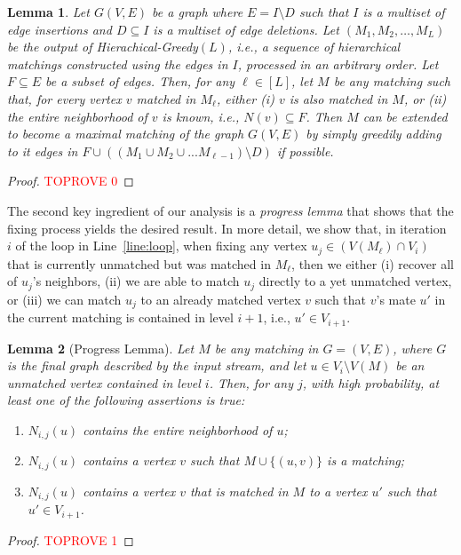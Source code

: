\documentclass[11pt,a4paper]{article}
\newtheorem{lemma}{Lemma}
\begin{document}
\begin{lemma}\label{lem:key-1}
Let $G(V,E)$ be a graph where $E = I \setminus D$ such that $I$ is a multiset of edge insertions and $D \subseteq I$ is a multiset of edge deletions. Let $(M_1, M_2, \dots, M_{L})$ be the output of \textsf{Hierachical-Greedy}$(L)$, i.e., a sequence of hierarchical matchings constructed using the edges in $I$, processed in an arbitrary order. Let $F \subseteq E$ be a subset of edges. Then, for any $\ell \in [L]$, let $M$ be any matching such that, for every vertex $v$ matched in $M_{\ell}$, either (i) $v$ is also matched in $M$, or (ii) the entire neighborhood of $v$ is known, i.e., $N(v) \subseteq F$. Then $M$ can be extended to become a maximal matching of the graph $G(V,E)$ by simply greedily adding to it edges in $F \cup \left( (M_1 \cup M_2 \cup ... M_{\ell-1}) \setminus D \right)$ if possible.
\end{lemma}
\begin{proof}\textcolor{red}{TOPROVE 0}\end{proof}

The second key ingredient of our analysis is a {\em progress lemma} that shows that the fixing process yields the desired result. In more detail, we show that, in iteration $i$ of the loop in Line~\ref{line:loop}, when fixing any vertex $u_j \in (V(M_\ell) \cap V_i)$ that is currently unmatched but was matched in $M_{\ell}$, then we either (i) recover all of $u_j$'s neighbors, (ii) we are able to match $u_j$ directly to a yet unmatched vertex, or (iii) we can match $u_j$ to an already matched vertex $v$ such that $v$'s mate $u'$ in the current matching is contained in level $i+1$, i.e., $u' \in V_{i+1}$. 


\begin{lemma}[Progress Lemma]\label{lem:next-level} \label{lem:progress}
 Let $M$ be any matching in $G=(V, E)$, where $G$ is the final graph described by the input stream, and let $u \in V_i \setminus V(M)$ be an unmatched vertex contained in level $i$. Then, for any $j$, with high probability, at least one of the following assertions is true:
 \begin{enumerate}
     \item $N_{i,j}(u)$ contains the entire neighborhood of $u$; \label{item:one}
     \item $N_{i,j}(u)$ contains a vertex $v$ such that $M \cup \{(u,v) \}$ is a matching; \label{item:two}
     \item $N_{i,j}(u)$ contains a vertex $v$ that is matched in $M$ to a vertex $u'$ such that $u' \in V_{i+1}$. \label{item:three}
 \end{enumerate}
\end{lemma}
\begin{proof}\textcolor{red}{TOPROVE 1}\end{proof}
\end{document}
